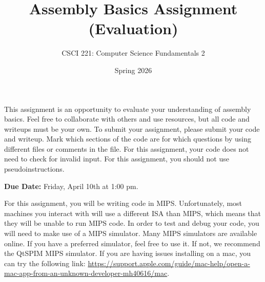 \documentclass{exam}
\begin{document}
\title{Assembly Basics Assignment (Evaluation)}
\author{CSCI 221: Computer Science Fundamentals 2}
\date{Spring 2026}
\maketitle


This assignment is an opportunity to evaluate your understanding of assembly basics. 
Feel free to collaborate with others and use resources, but all code and writeups must be your own. 
To submit your assignment, please submit your code and writeup. 
Mark which sections of the code are for which questions by using different files or comments in the file. 
For this assignment, your code does not need to check for invalid input. 
For this assignment, you should not use pseudoinstructions. 

\textbf{Due Date:}
Friday, April 10th at 1:00 pm. 

For this assignment, you will be writing code in MIPS. 
Unfortunately, most machines you interact with will use a different ISA than MIPS, which means that they will be unable to run MIPS code. 
In order to test and debug your code, you will need to make use of a MIPS simulator. 
Many MIPS simulators are available online. 
If you have a preferred simulator, feel free to use it. 
If not, we recommend the QtSPIM MIPS simulator. 
If you are having issues installing on a mac, you can try the following link: \url{https://support.apple.com/guide/mac-help/open-a-mac-app-from-an-unknown-developer-mh40616/mac}. 
\end{document}
